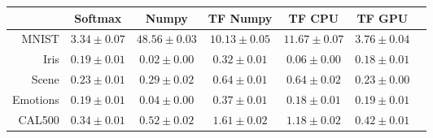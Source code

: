 \begin{tabular}{r|cccccc}
& Softmax & Numpy & TF Numpy & TF CPU & TF GPU \\
\hline
MNIST & $3.34 \pm 0.07$ & $48.56 \pm 0.03$ & $10.13 \pm 0.05$ & $11.67 \pm 0.07$ & $3.76 \pm 0.04$ \\
Iris & $0.19 \pm 0.01$ & $0.02 \pm 0.00$ & $0.32 \pm 0.01$ & $0.06 \pm 0.00$ & $0.18 \pm 0.01$ \\
Scene & $0.23 \pm 0.01$ & $0.29 \pm 0.02$ & $0.64 \pm 0.01$ & $0.64 \pm 0.02$ & $0.23 \pm 0.00$ \\
Emotions & $0.19 \pm 0.01$ & $0.04 \pm 0.00$ & $0.37 \pm 0.01$ & $0.18 \pm 0.01$ & $0.19 \pm 0.01$ \\
CAL500 & $0.34 \pm 0.01$ & $0.52 \pm 0.02$ & $1.61 \pm 0.02$ & $1.18 \pm 0.02$ & $0.42 \pm 0.01$ \\
\end{tabular}
